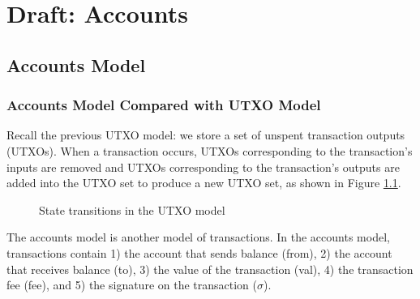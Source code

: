 \chapter{Draft: Accounts}

\section{Accounts Model}

\subsection{Accounts Model Compared with UTXO Model}
Recall the previous UTXO model: we store a set of unspent transaction outputs (UTXOs). When a transaction occurs, UTXOs corresponding to the transaction's inputs are removed and UTXOs corresponding to the transaction's outputs are added into the UTXO set to produce a new UTXO set, as shown in Figure \ref{fig:UTXOModelDiagram}.

\begin{figure}[h]
    \centering
    \caption{State transitions in the UTXO model}
    \label{fig:UTXOModelDiagram}
\end{figure}

The accounts model is another model of transactions.
In the accounts model, transactions contain 1) the account that sends balance (from), 2) the account that receives balance (to), 3) the value of the transaction (val), 4) the transaction fee (fee), and 5) the signature on the transaction ($\sigma$).

